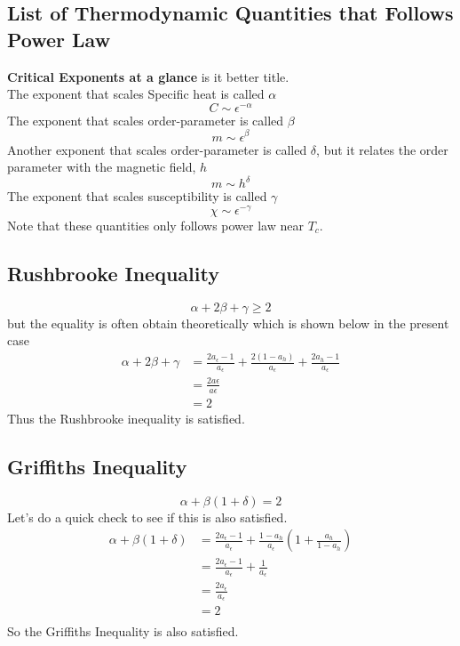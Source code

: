	\subsection{List of Thermodynamic Quantities that Follows Power Law}
	\textbf{Critical Exponents at a glance} is it better title.\\
		The exponent that scales Specific heat is called $\alpha$ 
		\begin{equation}
			C \sim \epsilon^{-\alpha}
		\end{equation}
		The exponent that scales order-parameter is called $\beta$ 
		\begin{equation}
			m \sim \epsilon^{\beta}
		\end{equation}
		Another exponent that scales order-parameter is called $\delta$, but it relates the order parameter with the magnetic field, $h$
		\begin{equation}
			m \sim h^{\delta}
		\end{equation}
		The exponent that scales susceptibility is called $\gamma$ 
		\begin{equation}
			\chi \sim \epsilon^{-\gamma}
		\end{equation}
		Note that these quantities only follows power law near $T_c$.
	\subsection{Rushbrooke Inequality}
		\begin{equation}
			\alpha + 2 \beta + \gamma \ge 2
		\end{equation}
		but the equality is often obtain theoretically which is shown below in the present case 
		\begin{align}
			\alpha + 2\beta + \gamma &= \frac{2 a_\epsilon -1}{a_\epsilon} 
					+ \frac{2 (1 - a_h)}{a_\epsilon}
					+ \frac{2 a_h - 1}{a_\epsilon} \nonumber \\
					&= \frac{2 a\epsilon}{a\epsilon} \nonumber \\
					&= 2 \nonumber
		\end{align}
	Thus the Rushbrooke inequality is satisfied.
	\subsection{Griffiths Inequality}
	\begin{equation}
		\alpha + \beta (1+\delta)  = 2
	\end{equation}
	Let's do a quick check to see if this is also satisfied.
	\begin{align}
		\alpha + \beta (1+\delta) &= \frac{2 a_\epsilon - 1}{a_\epsilon} 
									+ \frac{1 - a_h}{a_\epsilon} \left(1 + \frac{a_h}{1 - a_h}\right) \nonumber \\
								  &= \frac{2 a_\epsilon - 1}{a_\epsilon}  + \frac{1}{a_\epsilon} \nonumber \\
								  &= \frac{2 a_\epsilon}{a_\epsilon} \nonumber \\
								  &= 2 \nonumber \\
	\end{align}
	So the Griffiths Inequality is also satisfied. 
	
